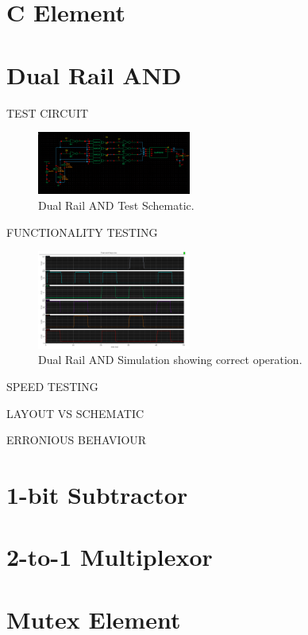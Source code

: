 \section{C Element}

\section{Dual Rail AND}

TEST CIRCUIT

\begin{figure}[h]  
\centering
   \includegraphics[width=0.45\textwidth]{Figures/DualRailANDTestSchem.png}
\caption{Dual Rail AND Test Schematic.}
\label {fig:DualRailANDTestSchem}
\end{figure}

FUNCTIONALITY TESTING 

\begin{figure}[h]  
\centering
   \includegraphics[width=0.45\textwidth]{Figures/DualAndCorrectOperation.png}
\caption{Dual Rail AND Simulation showing correct operation.}
\label {fig:DualAndCorrectOperation}
\end{figure}

SPEED TESTING

LAYOUT VS SCHEMATIC 

ERRONIOUS BEHAVIOUR







\section{1-bit Subtractor}

\section{2-to-1 Multiplexor}

\section{Mutex Element}
